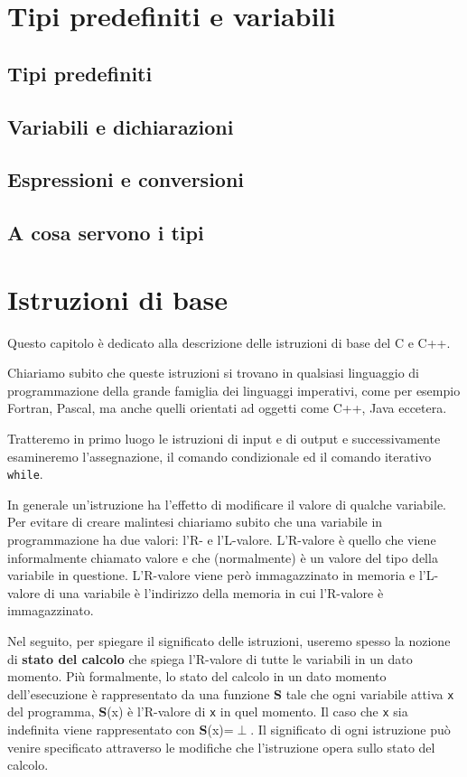 \documentclass[a4paper,12pt]{book}
\begin{document}
\chapter{Tipi predefiniti e variabili}
\section{Tipi predefiniti}
\section{Variabili e dichiarazioni}
\section{Espressioni e conversioni}
\section{A cosa servono i tipi}

\chapter{Istruzioni di base}
Questo capitolo è dedicato alla descrizione delle istruzioni di base del C e C++.

\noindent Chiariamo subito che queste istruzioni si trovano in qualsiasi linguaggio di programmazione della grande famiglia dei linguaggi imperativi, come per esempio Fortran, Pascal, ma anche quelli orientati ad oggetti come C++, Java eccetera.

\noindent Tratteremo in primo luogo le istruzioni di input e di output e successivamente esamineremo l'assegnazione, il comando condizionale ed il comando iterativo \texttt{while}.

In generale un'istruzione ha l'effetto di modificare il valore di qualche variabile.
Per evitare di creare malintesi chiariamo subito che una variabile in programmazione ha due valori: l'R- e l'L-valore. L'R-valore è quello che viene informalmente chiamato valore e che (normalmente) è un valore del tipo della variabile in questione.
L'R-valore viene però immagazzinato in memoria e l'L-valore di una variabile è l'indirizzo della memoria in cui l'R-valore è immagazzinato.

Nel seguito, per spiegare il significato delle istruzioni, useremo spesso la nozione di \textbf{stato del calcolo} che spiega l'R-valore di tutte le variabili in un dato momento.
Più formalmente, lo stato del calcolo in un dato momento dell'esecuzione è rappresentato da una funzione \textbf{S} tale che ogni variabile attiva \texttt{x} del programma, \textbf{S}(x) è l'R-valore di \texttt{x} in quel momento.
Il caso che \texttt{x} sia indefinita viene rappresentato con \textbf{S}(x)=$\perp$.
Il significato di ogni istruzione può venire specificato attraverso le modifiche che l'istruzione opera sullo stato del calcolo.
\end{document}
